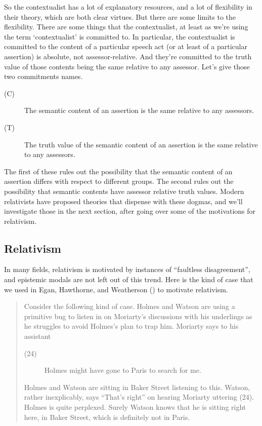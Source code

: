 \documentclass[
  11pt,
  letterpaper,
  DIV=11,
  numbers=noendperiod,
  twoside]{scrartcl}
\begin{document}
So the contextualist has a lot of explanatory resources, and a lot of
flexibility in their theory, which are both clear virtues. But there are
some limits to the flexibility. There are some things that the
contextualist, at least as we're using the term `contextualist' is
committed to. In particular, the contextualist is committed to the
content of a particular speech act (or at least of a particular
assertion) is absolute, not assessor-relative. And they're committed to
the truth value of those contents being the same relative to any
assessor. Let's give those two commitments names.

\begin{description}
\item[(C)]
The semantic content of an assertion is the same relative to any
assessors.
\item[(T)]
The truth value of the semantic content of an assertion is the same
relative to any assessors.
\end{description}

The first of these rules out the possibility that the semantic content
of an assertion differs with respect to different groups. The second
rules out the possibility that semantic contents have assessor relative
truth values. Modern relativists have proposed theories that dispense
with these dogmas, and we'll investigate those in the next section,
after going over some of the motivations for relativism.

\subsection{Relativism}\label{relativism}

In many fields, relativism is motivated by instances of ``faultless
disagreement'', and epistemic modals are not left out of this trend.
Here is the kind of case that we used in Egan, Hawthorne, and Weatherson
() to motivate relativism.

\begin{quote}
Consider the following kind of case. Holmes and Watson are using a
primitive bug to listen in on Moriarty's discussions with his underlings
as he struggles to avoid Holmes's plan to trap him. Moriarty says to his
assistant

\begin{description}
\item[(24)]
Holmes might have gone to Paris to search for me.
\end{description}

Holmes and Watson are sitting in Baker Street listening to this. Watson,
rather inexplicably, says ``That's right'' on hearing Moriarty uttering
(24). Holmes is quite perplexed. Surely Watson knows that he is sitting
right here, in Baker Street, which is definitely not in Paris.
\end{quote}
\end{document}
